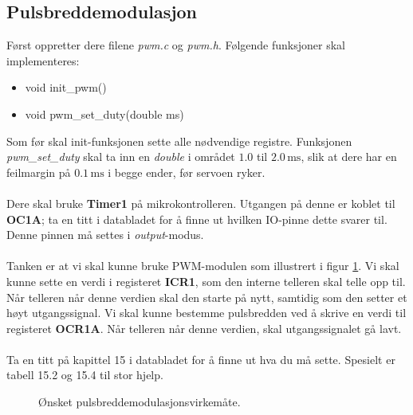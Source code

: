 \documentclass[11pt,a4paper]{article}
\begin{document}
\subsection{Pulsbreddemodulasjon}
Først oppretter dere filene \textit{pwm.c} og \textit{pwm.h}. Følgende funksjoner skal implementeres:
\begin{itemize}
\item void init\_pwm()
\item void pwm\_set\_duty(double ms)
\end{itemize}
Som før skal init-funksjonen sette alle nødvendige registre. Funksjonen \textit{pwm\_set\_duty} skal ta inn en \textit{double} i området $1.0$ til $2.0\,\mathrm{ms}$, slik at dere har en feilmargin på $0.1\,\mathrm{ms}$ i begge ender, før servoen ryker.\\
\\
Dere skal bruke \textbf{Timer1} på mikrokontrolleren. Utgangen på denne er koblet til \textbf{OC1A}; ta en titt i databladet for å finne ut hvilken IO-pinne dette svarer til. Denne pinnen må settes i \textit{output}-modus.\\
\\
Tanken er at vi skal kunne bruke PWM-modulen som illustrert i figur \ref{PWM::14}. Vi skal kunne sette en verdi i registeret \textbf{ICR1}, som den interne telleren skal telle opp til. Når telleren når denne verdien skal den starte på nytt, samtidig som den setter et høyt utgangssignal. Vi skal kunne bestemme pulsbredden ved å skrive en verdi til registeret \textbf{OCR1A}. Når telleren når denne verdien, skal utgangssignalet gå lavt.\\
\\
Ta en titt på kapittel 15 i databladet for å finne ut hva du må sette. Spesielt er tabell 15.2 og 15.4 til stor hjelp.
\begin{figure}[h]
\centering
{}
\caption{Ønsket pulsbreddemodulasjonsvirkemåte.}
\label{PWM::14}
\end{figure}
\end{document}

